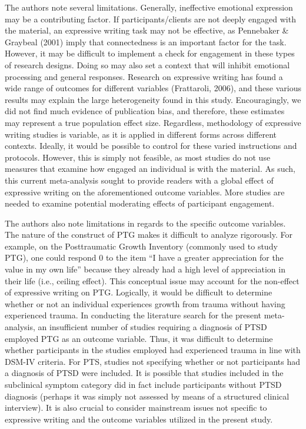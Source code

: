 \documentclass[man]{apa6}
\newcounter{author}
\theoremstyle{definition}
\theoremstyle{definition}
\theoremstyle{definition}
\theoremstyle{remark}
\begin{document}
The authors note several limitations. Generally, ineffective emotional
expression may be a contributing factor. If participants/clients are not
deeply engaged with the material, an expressive writing task may not be
effective, as Pennebaker \& Graybeal (2001) imply that connectedness is
an important factor for the task. However, it may be difficult to
implement a check for engagement in these types of research designs.
Doing so may also set a context that will inhibit emotional processing
and general responses. Research on expressive writing has found a wide
range of outcomes for different variables (Frattaroli, 2006), and these
various results may explain the large heterogeneity found in this study.
Encouragingly, we did not find much evidence of publication bias, and
therefore, these estimates may represent a true population effect size.
Regardless, methodology of expressive writing studies is variable, as it
is applied in different forms across different contexts. Ideally, it
would be possible to control for these varied instructions and
protocols. However, this is simply not feasible, as most studies do not
use measures that examine how engaged an individual is with the
material. As such, this current meta-analysis sought to provide readers
with a global effect of expressive writing on the aforementioned outcome
variables. More studies are needed to examine potential moderating
effects of participant engagement.

The authors also note limitations in regards to the specific outcome
variables. The nature of the construct of PTG makes it difficult to
analyze rigorously. For example, on the Posttraumatic Growth Inventory
(commonly used to study PTG), one could respond 0 to the item \enquote{I
have a greater appreciation for the value in my own life} because they
already had a high level of appreciation in their life (i.e., ceiling
effect). This conceptual issue may account for the non-effect of
expressive writing on PTG. Logically, it would be difficult to determine
whether or not an individual experiences growth from trauma without
having experienced trauma. In conducting the literature search for the
present meta-analysis, an insufficient number of studies requiring a
diagnosis of PTSD employed PTG as an outcome variable. Thus, it was
difficult to determine whether participants in the studies employed had
experienced trauma in line with DSM-IV criteria. For PTS, studies not
specifying whether or not participants had a diagnosis of PTSD were
included. It is possible that studies included in the subclinical
symptom category did in fact include participants without PTSD diagnosis
(perhaps it was simply not assessed by means of a structured clinical
interview). It is also crucial to consider mainstream issues not
specific to expressive writing and the outcome variables utilized in the
present study.
\end{document}
